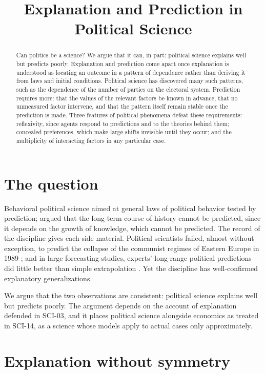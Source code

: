 \documentclass{situationist-preprint}
\title{Explanation and Prediction in Political Science}
\begin{document}
\maketitle

\begin{abstract}
Can politics be a science? We argue that it can, in part: political science explains well but predicts poorly. Explanation and prediction come apart once explanation is understood as locating an outcome in a pattern of dependence rather than deriving it from laws and initial conditions. Political science has discovered many such patterns, such as the dependence of the number of parties on the electoral system. Prediction requires more: that the values of the relevant factors be known in advance, that no unmeasured factor intervene, and that the pattern itself remain stable once the prediction is made. Three features of political phenomena defeat these requirements: reflexivity, since agents respond to predictions and to the theories behind them; concealed preferences, which make large shifts invisible until they occur; and the multiplicity of interacting factors in any particular case.
\end{abstract}

\section{The question}

Behavioral political science aimed at general laws of political behavior tested by prediction; \citet{Popper1957} argued that the long-term course of history cannot be predicted, since it depends on the growth of knowledge, which cannot be predicted. The record of the discipline gives each side material. Political scientists failed, almost without exception, to predict the collapse of the communist regimes of Eastern Europe in 1989 \citep{Kuran1991}; and in large forecasting studies, experts' long-range political predictions did little better than simple extrapolation \citep{Tetlock2005}. Yet the discipline has well-confirmed explanatory generalizations.

We argue that the two observations are consistent: political science explains well but predicts poorly. The argument depends on the account of explanation defended in SCI-03, and it places political science alongside economics as treated in SCI-14, as a science whose models apply to actual cases only approximately.

\section{Explanation without symmetry}
\end{document}

